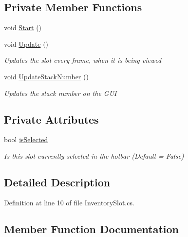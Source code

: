 \subsection*{Private Member Functions}
\begin{DoxyCompactItemize}
\item 
void \hyperlink{class_bee_game_1_1_inventory_1_1_inventory_slot_ae5fe19d6bdefd8c6ceb6800bba276f93}{Start} ()
\item 
void \hyperlink{class_bee_game_1_1_inventory_1_1_inventory_slot_a30c6d192daefd9e7108cad1bafda814a}{Update} ()
\begin{DoxyCompactList}\small\item\em Updates the slot every frame, when it is being viewed \end{DoxyCompactList}\item 
void \hyperlink{class_bee_game_1_1_inventory_1_1_inventory_slot_a58cc9b63c6af1dceccee17210b73f70d}{Update\+Stack\+Number} ()
\begin{DoxyCompactList}\small\item\em Updates the stack number on the G\+UI \end{DoxyCompactList}\end{DoxyCompactItemize}
\subsection*{Private Attributes}
\begin{DoxyCompactItemize}
\item 
bool \hyperlink{class_bee_game_1_1_inventory_1_1_inventory_slot_a3c2a56594821f0567448a541b1236961}{is\+Selected}
\begin{DoxyCompactList}\small\item\em Is this slot currently selected in the hotbar (Default = False) \end{DoxyCompactList}\end{DoxyCompactItemize}


\subsection{Detailed Description}


Definition at line 10 of file Inventory\+Slot.\+cs.



\subsection{Member Function Documentation}
\mbox{\label{class_bee_game_1_1_inventory_1_1_inventory_slot_a582545a412e4b746be55d36a11e61e96}} 
